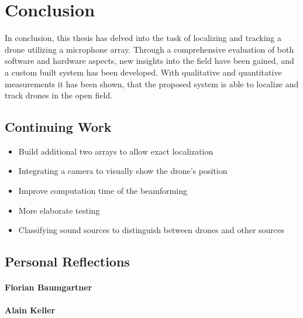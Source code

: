 \chapter{Conclusion}
In conclusion, this thesis has delved into the task of
localizing and tracking a drone utilizing a microphone array.
Through a comprehensive evaluation of both software and hardware aspects,
new insights into the field have been gained, and
a custom built system has been developed.
With qualitative and quantitative measurements it has been shown,
that the proposed system is able to localize and track
drones in the open field.

\section{Continuing Work}

\bigskip
\begin{itemize}
	\item Build additional two arrays to allow exact localization
	\item Integrating a camera to visually show the drone's position
	\item Improve computation time of the beamforming
	\item More elaborate testing
	\item Classifying sound sources to distinguish between drones and other sources
\end{itemize}
\newpage

\newpage
\section{Personal Reflections}
\subsubsection{Florian Baumgartner}

\subsubsection{Alain Keller}
